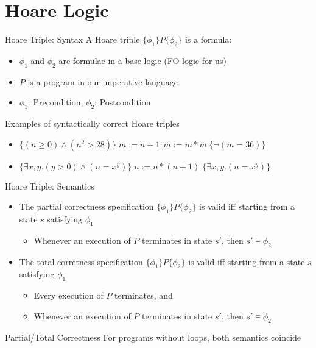 \documentclass[presentation]{beamer}
\begin{document}
\section{Hoare Logic}
\label{sec:orgec7a796}
\begin{frame}[label={sec:orga623d02}]{Hoare Triple: Syntax}
A \alert{Hoare triple} \(\{\phi_1\}P\{\phi_2\}\) is a formula:
\begin{itemize}
\item \(\phi_1\) and \(\phi_2\) are formulae in a base logic (FO logic for us)
\item \(P\) is a program in our imperative language
\item \(\phi_1\): \alert{Precondition}, \(\phi_2\): \alert{Postcondition}
\end{itemize}


Examples of syntactically correct Hoare triples
\begin{itemize}
\item \(\{(n\ge 0)\wedge(n^2>28)\}\;m:=n+1; m:=m*m\;\{\neg(m=36)\}\)
\item \(\{\exists x,y.(y>0)\wedge(n=x^y)\}\;n:=n*(n+1)\;\{\exists x,y.(n=x^y)\}\)
\end{itemize}
\end{frame}
\begin{frame}[label={sec:orga154981}]{Hoare Triple: Semantics}
\begin{itemize}
\item The \alert{partial correctness} specification \(\{\phi_1\}P\{\phi_2\}\) is valid iff starting from a state \(s\)
satisfying \(\phi_1\)
\begin{itemize}
\item Whenever an execution of \(P\) terminates in state \(s'\), then \(s'\vDash\phi_2\)
\end{itemize}
\item The \alert{total corretness} specification \(\{\phi_1\}P\{\phi_2\}\) is valid iff starting from a state \(s\)
satisfying \(\phi_1\)
\begin{itemize}
\item Every execution of \(P\) terminates, and
\item Whenever an execution of \(P\) terminates in state \(s'\), then \(s'\vDash\phi_2\)
\end{itemize}
\end{itemize}


\begin{block}{Partial/Total Correctness}
For programs without loops, both semantics coincide
\end{block}
\end{frame}
\end{document}
